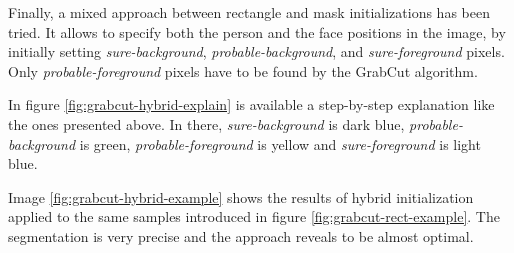 Finally, a mixed approach between rectangle and mask initializations has been tried. It allows to specify both the person and the face positions in the image, by initially setting \textit{sure-background}, \textit{probable-background}, and \textit{sure-foreground} pixels. Only \textit{probable-foreground} pixels have to be found by the GrabCut algorithm. 

In figure \ref{fig:grabcut-hybrid-explain} is available a step-by-step explanation like the ones presented above. In there, \textit{sure-background} is dark blue, \textit{probable-background} is green, \textit{probable-foreground} is yellow and \textit{sure-foreground} is light blue.

Image \ref{fig:grabcut-hybrid-example} shows the results of hybrid initialization applied to the same samples introduced in figure \ref{fig:grabcut-rect-example}. The segmentation is very precise and the approach reveals to be almost optimal.


